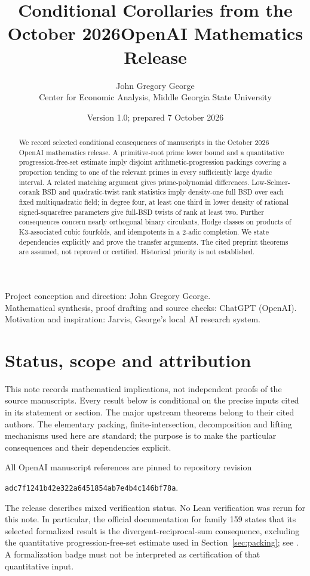 \documentclass[11pt]{article}
\title{Conditional Corollaries from the October 2026\newline OpenAI Mathematics Release}
\author{John Gregory George\\
\small Center for Economic Analysis, Middle Georgia State University}
\date{Version 1.0; prepared 7 October 2026}
\theoremstyle{definition}
\theoremstyle{remark}
\begin{document}
\maketitle
\begin{center}\small
Project conception and direction: John Gregory George.\\
Mathematical synthesis, proof drafting and source checks: ChatGPT (OpenAI).\\
Motivation and inspiration: Jarvis, George's local AI research system.
\end{center}
\begin{abstract}
We record selected conditional consequences of manuscripts in the October 2026 OpenAI mathematics release. A primitive-root prime lower bound and a quantitative progression-free-set estimate imply disjoint arithmetic-progression packings covering a proportion tending to one of the relevant primes in every sufficiently large dyadic interval. A related matching argument gives prime-polynomial differences. Low-Selmer-corank BSD and quadratic-twist rank statistics imply density-one full BSD over each fixed multiquadratic field; in degree four, at least one third in lower density of rational signed-squarefree parameters give full-BSD twists of rank at least two. Further consequences concern nearly orthogonal binary circulants, Hodge classes on products of K3-associated cubic fourfolds, and idempotents in a 2-adic completion. We state dependencies explicitly and prove the transfer arguments. The cited preprint theorems are assumed, not reproved or certified. Historical priority is not established.
\end{abstract}

\section{Status, scope and attribution}
This note records mathematical implications, not independent proofs of the source manuscripts. Every result below is conditional on the precise inputs cited in its statement or section. The major upstream theorems belong to their cited authors. The elementary packing, finite-intersection, decomposition and lifting mechanisms used here are standard; the purpose is to make the particular consequences and their dependencies explicit.

All OpenAI manuscript references are pinned to repository revision
\begin{center}\small\texttt{adc7f1241b42e322a6451854ab7e4b4c146bf78a}.\end{center}
The release describes mixed verification status. No Lean verification was rerun for this note. In particular, the official documentation for family 159 states that its selected formalized result is the divergent-reciprocal-sum consequence, excluding the quantitative progression-free-set estimate used in Section~\ref{sec:packing}; see \cite{formal159}. A formalization badge must not be interpreted as certification of that quantitative input.
\end{document}
